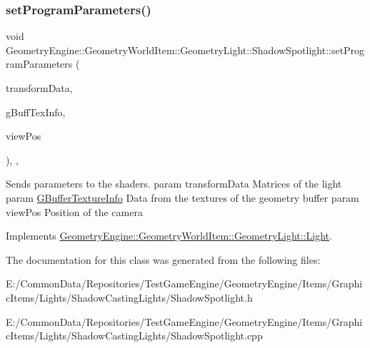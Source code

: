 \subsubsection{\texorpdfstring{setProgramParameters()}{setProgramParameters()}}
{\footnotesize\ttfamily void Geometry\+Engine\+::\+Geometry\+World\+Item\+::\+Geometry\+Light\+::\+Shadow\+Spotlight\+::set\+Program\+Parameters (\begin{DoxyParamCaption}\item[{const \mbox{\hyperlink{struct_geometry_engine_1_1_lighting_transformation_data}{Lighting\+Transformation\+Data}} \&}]{transform\+Data,  }\item[{const \mbox{\hyperlink{struct_geometry_engine_1_1_g_buffer_texture_info}{G\+Buffer\+Texture\+Info}} \&}]{g\+Buff\+Tex\+Info,  }\item[{const Q\+Vector3D \&}]{view\+Pos }\end{DoxyParamCaption})\hspace{0.3cm}{\ttfamily [override]}, {\ttfamily [protected]}, {\ttfamily [virtual]}}

Sends parameters to the shaders. param transform\+Data Matrices of the light param \mbox{\hyperlink{struct_geometry_engine_1_1_g_buffer_texture_info}{G\+Buffer\+Texture\+Info}} Data from the textures of the geometry buffer param view\+Pos Position of the camera 

Implements \mbox{\hyperlink{class_geometry_engine_1_1_geometry_world_item_1_1_geometry_light_1_1_light_a366be5945389fe58df4bf5aa8c43138f}{Geometry\+Engine\+::\+Geometry\+World\+Item\+::\+Geometry\+Light\+::\+Light}}.



The documentation for this class was generated from the following files\+:\begin{DoxyCompactItemize}
\item 
E\+:/\+Common\+Data/\+Repositories/\+Test\+Game\+Engine/\+Geometry\+Engine/\+Items/\+Graphic\+Items/\+Lights/\+Shadow\+Casting\+Lights/Shadow\+Spotlight.\+h\item 
E\+:/\+Common\+Data/\+Repositories/\+Test\+Game\+Engine/\+Geometry\+Engine/\+Items/\+Graphic\+Items/\+Lights/\+Shadow\+Casting\+Lights/Shadow\+Spotlight.\+cpp\end{DoxyCompactItemize}
